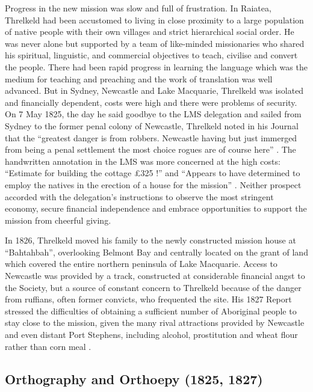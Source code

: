 {Progress in the new mission was slow and full of frustration. In Raiatea, Threlkeld had been accustomed to living in close proximity to a large population of native people with their own villages and strict hierarchical social order. He was never alone but supported by a team of like-minded missionaries who shared his spiritual, linguistic, and commercial objectives to teach, civilise and convert the people. There had been rapid progress in learning the language which was the medium for teaching and preaching and the work of translation was well advanced. But in Sydney, Newcastle and Lake Macquarie, Threlkeld was isolated and financially dependent, costs were high and there were problems of security. On 7 May 1825, the day he said goodbye to the LMS delegation and sailed from Sydney to the former penal colony of Newcastle, Threlkeld noted in his Journal that the “greatest danger is from robbers. Newcastle having but just immerged from being a penal settlement the most choice rogues are of course here” \citep[fol. 3v]{threlkeld_journal_1824}. The handwritten annotation in the LMS was more concerned at the high costs: “Estimate for building the cottage £325 !” and “Appears to have determined to employ the natives in the erection of a house for the mission” \citep[fos. 5--5v]{threlkeld_journal_1824}. Neither prospect accorded with the delegation’s instructions to observe the most stringent economy, secure financial independence and embrace opportunities to support the mission from cheerful giving.

In 1826, Threlkeld moved his family to the newly constructed mission house at “Bahtahbah”, overlooking Belmont Bay and centrally located on the grant of land which covered the entire northern peninsula of Lake Macquarie. Access to Newcastle was provided by a track, constructed at considerable financial angst to the Society, but a source of constant concern to Threlkeld because of the danger from ruffians, often former convicts, who frequented the site. His 1827 Report stressed the difficulties of obtaining a sufficient number of Aboriginal people to stay close to the mission, given the many rival attractions provided by Newcastle and even distant Port Stephens, including alcohol, prostitution and wheat flour rather than corn meal \citep[Circular]{threlkeld_specimens_1827}.

\subsection{Orthography and Orthoepy (1825, 1827)}

}
